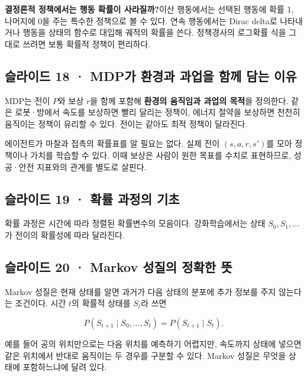 \documentclass[11pt,a4paper]{article}
\begin{document}
\par\medskip\noindent\textbf{결정론적 정책에서는 행동 확률이 사라질까?}\quad 이산 행동에서는 선택된 행동에 확률 1, 나머지에 0을 주는 특수한 정책으로 볼 수 있다. 연속 행동에서는 Dirac delta로 나타내거나 행동을 상태의 함수로 대입해 궤적의 확률을 쓴다. 정책경사의 로그확률 식을 그대로 쓰려면 보통 확률적 정책이 편리하다.\par

\subsection{슬라이드 18 · MDP가 환경과 과업을 함께 담는 이유}

MDP는 전이 $P$와 보상 $r$을 함께 포함해 \textbf{환경의 움직임과 과업의 목적}을 정의한다. 같은 로봇·방에서 속도를 보상하면 빨리 달리는 정책이, 에너지 절약을 보상하면 천천히 움직이는 정책이 유리할 수 있다. 전이는 같아도 최적 정책이 달라진다.\par

에이전트가 마찰과 접촉의 확률표를 알 필요는 없다. 실제 전이 $(s,a,r,s')$를 모아 정책이나 가치를 학습할 수 있다. 이때 보상은 사람이 원한 목표를 수치로 표현하므로, 성공·안전 지표와의 관계를 별도로 살핀다.\par

\subsection{슬라이드 19 · 확률 과정의 기초}

확률 과정은 시간에 따라 정렬된 확률변수의 모음이다. 강화학습에서는 상태 $S_0,S_1,\ldots$가 전이의 확률성에 따라 달라진다.\par

\subsection{슬라이드 20 · Markov 성질의 정확한 뜻}

Markov 성질은 현재 상태를 알면 과거가 다음 상태의 분포에 추가 정보를 주지 않는다는 조건이다. 시간 $t$의 확률적 상태를 $S_t$라 쓰면\par

\[
P(S_{t+1}\mid S_0,\ldots,S_t)=P(S_{t+1}\mid S_t).
\]

예를 들어 공의 위치만으로는 다음 위치를 예측하기 어렵지만, 속도까지 상태에 넣으면 같은 위치에서 반대로 움직이는 두 경우를 구분할 수 있다. Markov 성질은 무엇을 상태에 포함하느냐에 달려 있다.\par
\end{document}
